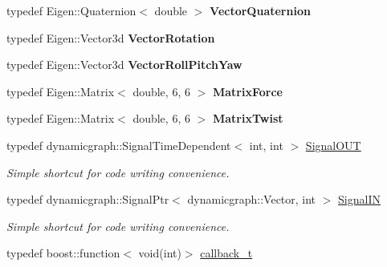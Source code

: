 \begin{DoxyCompactItemize}
\item 
typedef Eigen\+::\+Quaternion$<$ double $>$ {\bfseries Vector\+Quaternion}\hypertarget{namespacedynamic__graph_a9f22f1c9369a98e94778717faeec3f4b}{}\label{namespacedynamic__graph_a9f22f1c9369a98e94778717faeec3f4b}

\item 
typedef Eigen\+::\+Vector3d {\bfseries Vector\+Rotation}\hypertarget{namespacedynamic__graph_afe3e8341b18b6a3b59f2fa579c2e12c1}{}\label{namespacedynamic__graph_afe3e8341b18b6a3b59f2fa579c2e12c1}

\item 
typedef Eigen\+::\+Vector3d {\bfseries Vector\+Roll\+Pitch\+Yaw}\hypertarget{namespacedynamic__graph_af84ad658e1cf7d496958772210dd51b6}{}\label{namespacedynamic__graph_af84ad658e1cf7d496958772210dd51b6}

\item 
typedef Eigen\+::\+Matrix$<$ double, 6, 6 $>$ {\bfseries Matrix\+Force}\hypertarget{namespacedynamic__graph_a43b4e15f6e943f7208372fd22ea108eb}{}\label{namespacedynamic__graph_a43b4e15f6e943f7208372fd22ea108eb}

\item 
typedef Eigen\+::\+Matrix$<$ double, 6, 6 $>$ {\bfseries Matrix\+Twist}\hypertarget{namespacedynamic__graph_a933ba3678a5e0b14430acd27709cdf47}{}\label{namespacedynamic__graph_a933ba3678a5e0b14430acd27709cdf47}

\item 
typedef dynamicgraph\+::\+Signal\+Time\+Dependent$<$ int, int $>$ \hyperlink{namespacedynamic__graph_a9d80c350c95e161319d7a6e629ecdc4b}{Signal\+O\+UT}\hypertarget{namespacedynamic__graph_a9d80c350c95e161319d7a6e629ecdc4b}{}\label{namespacedynamic__graph_a9d80c350c95e161319d7a6e629ecdc4b}

\begin{DoxyCompactList}\small\item\em Simple shortcut for code writing convenience. \end{DoxyCompactList}\item 
typedef dynamicgraph\+::\+Signal\+Ptr$<$ dynamicgraph\+::\+Vector, int $>$ \hyperlink{namespacedynamic__graph_ae1463c695a6915ea3f9ab4311beb527a}{Signal\+IN}\hypertarget{namespacedynamic__graph_ae1463c695a6915ea3f9ab4311beb527a}{}\label{namespacedynamic__graph_ae1463c695a6915ea3f9ab4311beb527a}

\begin{DoxyCompactList}\small\item\em Simple shortcut for code writing convenience. \end{DoxyCompactList}\item 
typedef boost\+::function$<$ void(int)$>$ \hyperlink{namespacedynamic__graph_adf7d40f2a8d1425af80c14f90e58e961}{callback\+\_\+t}\hypertarget{namespacedynamic__graph_adf7d40f2a8d1425af80c14f90e58e961}{}\label{namespacedynamic__graph_adf7d40f2a8d1425af80c14f90e58e961}


\end{DoxyCompactItemize}
